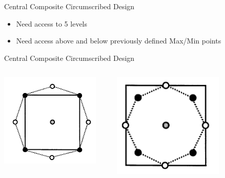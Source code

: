 \documentclass[14pt]{beamer}
\begin{document}
\begin{frame}{Central Composite Circumscribed Design}
\pause
\begin{itemize}
\item Need access to 5 levels
\pause
\item Need access above and below previously defined Max/Min points
\end{itemize}

\end{frame}

\begin{frame}{Central Composite Circumscribed Design}

\begin{columns}
    \begin{column}{0.5\textwidth}
      \includegraphics[width=0.9\textwidth]{3level2factorCCI.png}
    \end{column}
    \pause
    \begin{column}{0.5\textwidth}
      \includegraphics[width=0.7\textwidth]{3level2factorCCI2.png}
    \end{column}
  \end{columns}

\end{frame}
\end{document}
